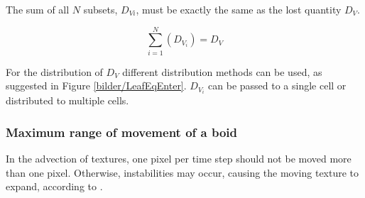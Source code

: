 \documentclass[a4paper, 10pt, journal]{wissarbIEEE}      %
\begin{document}
The sum of all $N$ subsets, $D_{Vi}$, must be exactly the same as the lost quantity $D_V$.


\begin{equation}
\sum_{i=1}^N(D_{V_i}) = D_V
\label{Form_SummeD_V_i}
\end{equation}

For the distribution of $D_V$  different distribution methods can be used, as suggested in Figure \ref{bilder/LeafEqEnter}.
$D_{V_i}$ can be passed to a single cell or distributed to multiple cells.


\subsubsection{Maximum range of movement of a boid}

In the advection of textures, one pixel per time step should not be moved more than one pixel. Otherwise, instabilities may occur, causing the moving texture to expand, according to \cite{GPUGems1}.


\end{document}
